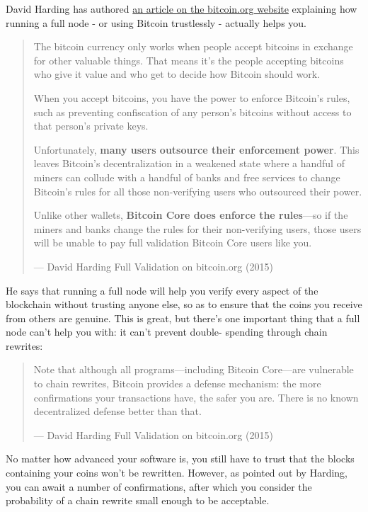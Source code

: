 David Harding has authored
\href{https://bitcoin.org/en/bitcoin-core/features/validation}{an
article on the bitcoin.org website} explaining how running a full node -
or using Bitcoin trustlessly - actually helps you.

\begin{quote}
The bitcoin currency only works when people accept bitcoins in exchange
for other valuable things. That means it's the people accepting bitcoins
who give it value and who get to decide how Bitcoin should work.

When you accept bitcoins, you have the power to enforce Bitcoin's rules,
such as preventing confiscation of any person's bitcoins without access
to that person's private keys.

Unfortunately, \textbf{many users outsource their enforcement power}.
This leaves Bitcoin's decentralization in a weakened state where a
handful of miners can collude with a handful of banks and free services
to change Bitcoin's rules for all those non-verifying users who
outsourced their power.

Unlike other wallets, \textbf{Bitcoin Core does enforce the rules}---so
if the miners and banks change the rules for their non-verifying users,
those users will be unable to pay full validation Bitcoin Core users
like you.

---  David Harding Full Validation on bitcoin.org (2015)
\end{quote}

He says that running a full node will help you verify every aspect of
the blockchain without trusting anyone else, so as to ensure that the
coins you receive from others are genuine. This is great, but there's
one important thing that a full node can't help you with: it can't
prevent double- spending through chain rewrites:

\begin{quote}
Note that although all programs---including Bitcoin Core---are
vulnerable to chain rewrites, Bitcoin provides a defense mechanism: the
more confirmations your transactions have, the safer you are. There is
no known decentralized defense better than that.

---  David Harding Full Validation on bitcoin.org (2015)
\end{quote}

No matter how advanced your software is, you still have to trust that
the blocks containing your coins won't be rewritten. However, as pointed
out by Harding, you can await a number of confirmations, after which you
consider the probability of a chain rewrite small enough to be
acceptable.

